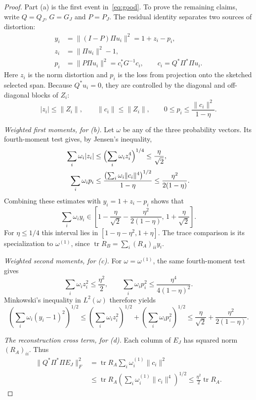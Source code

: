 \documentclass[11pt]{article}
\theoremstyle{definition}\newtheorem{definition}[theorem]{Definition}
\theoremstyle{remark}\newtheorem{remark}[theorem]{Remark}
\newcommand{\tr}{\operatorname{tr}}
\newcommand{\1}{\mathbf 1}
\begin{document}
\begin{proof}
Part (a) is the first event in~\eqref{eq:good}. To prove the remaining
claims, write $Q=Q_J$, $G=G_J$ and $P=P_J$. The residual identity
separates two sources of distortion:
\begin{align*}
 y_i&=\|(I-P)\Pi u_i\|^2=1+z_i-p_i,\\
 z_i&=\|\Pi u_i\|^2-1,\\
 p_i&=\|P\Pi u_i\|^2=c_i^*G^{-1}c_i,\qquad
 c_i=Q^*\Pi^*\Pi u_i.
\end{align*}
Here $z_i$ is the norm distortion and $p_i$ is the loss from projection
onto the sketched selected span. Because $Q^*u_i=0$, they are controlled
by the diagonal and off-diagonal blocks of $Z_i$:
\[
 |z_i|\le\|Z_i\|,\qquad
 \|c_i\|\le\|Z_i\|,\qquad
 0\le p_i\le\frac{\|c_i\|^2}{1-\eta}.
\]

\emph{Weighted first moments, for (b).}
Let $\omega$ be any of the three probability vectors. Its fourth-moment
test gives, by Jensen's inequality,
\begin{align*}
 \sum_i\omega_i|z_i|
 &\le\Bigl(\sum_i\omega_i z_i^4\Bigr)^{1/4}
 \le\frac\eta{\sqrt2},\\
 \sum_i\omega_ip_i
 &\le\frac{\bigl(\sum_i\omega_i\|c_i\|^4\bigr)^{1/2}}{1-\eta}
 \le\frac{\eta^2}{2(1-\eta)}.
\end{align*}
Combining these estimates with $y_i=1+z_i-p_i$ shows that
\[
 \sum_i\omega_i y_i\in
 \left[1-\frac\eta{\sqrt2}-\frac{\eta^2}{2(1-\eta)},\,
       1+\frac\eta{\sqrt2}\right].
\]
For $\eta\le1/4$ this interval lies in $[1-\eta-\eta^2,1+\eta]$.
The trace comparison is its specialization to $\omega^{(1)}$, since
$\tr R_B=\sum_i(R_A)_{ii}y_i$.

\emph{Weighted second moments, for (c).}
For $\omega=\omega^{(1)}$, the same fourth-moment test gives
\[
 \sum_i\omega_i z_i^2\le\frac{\eta^2}2,\qquad
 \sum_i\omega_i p_i^2\le\frac{\eta^4}{4(1-\eta)^2}.
\]
Minkowski's inequality in $L^2(\omega)$ therefore yields
\[
 \left(\sum_i\omega_i(y_i-1)^2\right)^{1/2}
 \le\left(\sum_i\omega_i z_i^2\right)^{1/2}
   +\left(\sum_i\omega_i p_i^2\right)^{1/2}
 \le\frac\eta{\sqrt2}+\frac{\eta^2}{2(1-\eta)}.
\]

\emph{The reconstruction cross term, for (d).}
Each column of $E_J$ has squared norm $(R_A)_{ii}$. Thus
\begin{align*}
 \|Q^*\Pi^*\Pi E_J\|_F^2
 &=\tr R_A\sum_i\omega_i^{(1)}\|c_i\|^2\\
 &\le\tr R_A\left(\sum_i\omega_i^{(1)}\|c_i\|^4\right)^{1/2}
 \le\frac{\eta^2}2\tr R_A.
\end{align*}
\end{proof}
\end{document}

